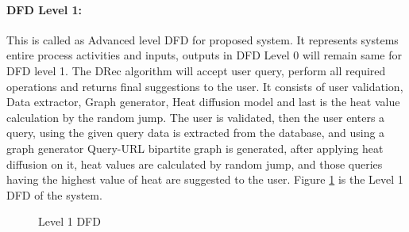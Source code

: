\paragraph{DFD Level 1: }This is called as Advanced level DFD for proposed system. It represents systems entire process activities and inputs, outputs in DFD Level 0 will remain same for DFD level 1. The DRec algorithm will accept user query, perform all required operations and returns final suggestions to the user. It consists of user validation, Data extractor, Graph generator, Heat diffusion model and last is the heat value calculation by the random jump. The user is validated, then the user enters a query, using the given query data is extracted from the database, and using a graph generator Query-URL bipartite graph is generated, after applying heat diffusion on it, heat values are calculated by random jump, and those queries having the highest value of heat are suggested to the user. Figure \ref{fig:DFD1} is the Level 1 DFD of the system.
\begin{figure}[!h]
	\centering
	\caption{Level 1 DFD}
	\label{fig:DFD1}
\end{figure}
